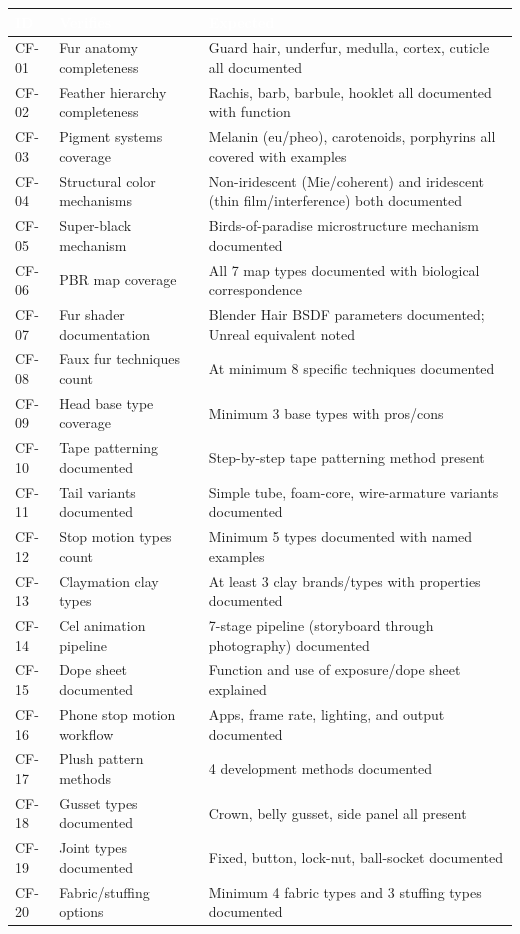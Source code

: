 \documentclass[11pt,letterpaper]{article}
\newcommand{\tableheader}[1]{\textbf{\sffamily\textcolor{white}{#1}}}
\begin{document}
\begin{center}
\begin{tabularx}{\textwidth}{C{1.5cm}L{3.5cm}X}
\toprule
{}
\tableheader{ID} & \tableheader{Verifies} & \tableheader{Expected} \\
\midrule
CF-01 & Fur anatomy completeness & Guard hair, underfur, medulla, cortex, cuticle all documented \\
CF-02 & Feather hierarchy completeness & Rachis, barb, barbule, hooklet all documented with function \\
CF-03 & Pigment systems coverage & Melanin (eu/pheo), carotenoids, porphyrins all covered with examples \\
CF-04 & Structural color mechanisms & Non-iridescent (Mie/coherent) and iridescent (thin film/interference) both documented \\
CF-05 & Super-black mechanism & Birds-of-paradise microstructure mechanism documented \\
CF-06 & PBR map coverage & All 7 map types documented with biological correspondence \\
CF-07 & Fur shader documentation & Blender Hair BSDF parameters documented; Unreal equivalent noted \\
CF-08 & Faux fur techniques count & At minimum 8 specific techniques documented \\
CF-09 & Head base type coverage & Minimum 3 base types with pros/cons \\
CF-10 & Tape patterning documented & Step-by-step tape patterning method present \\
CF-11 & Tail variants documented & Simple tube, foam-core, wire-armature variants documented \\
CF-12 & Stop motion types count & Minimum 5 types documented with named examples \\
CF-13 & Claymation clay types & At least 3 clay brands/types with properties documented \\
CF-14 & Cel animation pipeline & 7-stage pipeline (storyboard through photography) documented \\
CF-15 & Dope sheet documented & Function and use of exposure/dope sheet explained \\
CF-16 & Phone stop motion workflow & Apps, frame rate, lighting, and output documented \\
CF-17 & Plush pattern methods & 4 development methods documented \\
CF-18 & Gusset types documented & Crown, belly gusset, side panel all present \\
CF-19 & Joint types documented & Fixed, button, lock-nut, ball-socket documented \\
CF-20 & Fabric/stuffing options & Minimum 4 fabric types and 3 stuffing types documented \\
\bottomrule
\end{tabularx}
\end{center}
\end{document}
